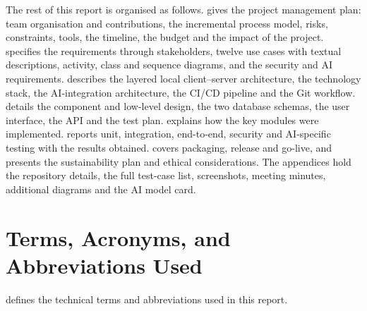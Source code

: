 The rest of this report is organised as follows.  gives the project
management plan: team organisation and contributions, the incremental process model,
risks, constraints, tools, the timeline, the budget and the impact of the project.
 specifies the requirements through stakeholders, twelve use cases with
textual descriptions, activity, class and sequence diagrams, and the security and AI
requirements.  describes the layered local client--server architecture, the
technology stack, the AI-integration architecture, the CI/CD pipeline and the Git
workflow.  details the component and low-level design, the two database
schemas, the user interface, the API and the test plan.  explains how the
key modules were implemented.  reports unit, integration, end-to-end,
security and AI-specific testing with the results obtained.  covers
packaging, release and go-live, and  presents the sustainability plan and
ethical considerations. The appendices hold the repository details, the full test-case
list, screenshots, meeting minutes, additional diagrams and the AI model card.

\section{Terms, Acronyms, and Abbreviations Used}

 defines the technical terms and abbreviations used in this report.

